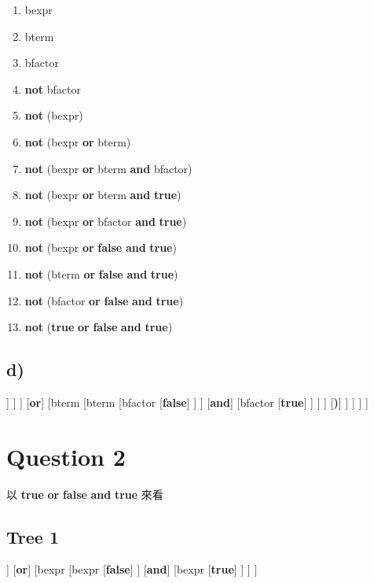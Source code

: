 \documentclass[12pt, A4]{article}
\begin{document}
	\begin{enumerate}
		\item bexpr
		\item bterm
		\item bfactor
		\item \textbf{not} bfactor
		\item \textbf{not} (bexpr)
		\item \textbf{not} (bexpr \textbf{or} bterm)
		\item \textbf{not} (bexpr \textbf{or} bterm \textbf{and} bfactor)
		\item \textbf{not} (bexpr \textbf{or} bterm \textbf{and} \textbf{true})
		\item \textbf{not} (bexpr \textbf{or} bfactor \textbf{and} \textbf{true})
		\item \textbf{not} (bexpr \textbf{or} \textbf{false} \textbf{and} \textbf{true})
		\item \textbf{not} (bterm \textbf{or} \textbf{false} \textbf{and} \textbf{true})
		\item \textbf{not} (bfactor \textbf{or} \textbf{false} \textbf{and} \textbf{true})
		\item \textbf{not} (\textbf{true} \textbf{or} \textbf{false} \textbf{and} \textbf{true})
	\end{enumerate}
	
	\newpage
	\subsection*{d)}
	
	\begin{forest}
		[bexpr
			[bterm
				[bfactor
					[\textbf{not}]
					[bfactor
						[\textbf{(}]
						[bexpr
							[bexpr
								[bterm
									[bfactor
										[\textbf{true}]
									]
								]
							]
							[\textbf{or}]
							[bterm
								[bterm
									[bfactor
										[\textbf{false}]
									]
								]
								[\textbf{and}]
								[bfactor
									[\textbf{true}]
								]
							]
						]
						[\textbf{)}]
					]
				]
			]
		]
	\end{forest}
	
	\newpage
	\section{Question 2}
	
	以 \textbf{true} \textbf{or} \textbf{false} \textbf{and} \textbf{true}  來看
	
	\subsection*{Tree 1}
	\begin{forest}
		[bexpr
			[bexpr
				[\textbf{true}]
			]
			[\textbf{or}]
			[bexpr
				[bexpr
					[\textbf{false}]
				]
				[\textbf{and}]
				[bexpr
					[\textbf{true}]
				]
			]
		]
	\end{forest}
	
\end{document}
